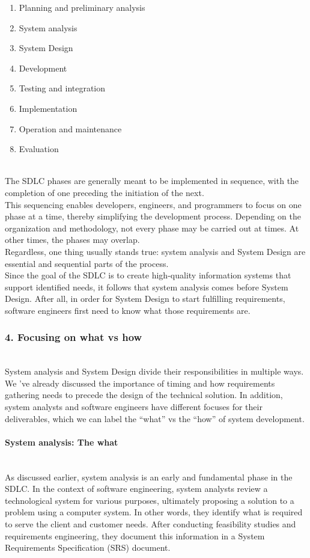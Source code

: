 \begin{enumerate}
\item
Planning and preliminary analysis
\item
System analysis
\item
System Design
\item
Development
\item
Testing and integration
\item
Implementation
\item
Operation and maintenance
\item
Evaluation
\end{enumerate}
\\
The SDLC phases are generally meant to be implemented in sequence, with the completion of one preceding the initiation of the next.
\\
This sequencing enables developers, engineers, and programmers to focus on one phase at a time, thereby simplifying the development process. Depending on the organization and methodology, not every phase may be carried out at times. At other times, the phases may overlap.
\\
Regardless, one thing usually stands true: system analysis and System Design are essential and sequential parts of the process.
\\
Since the goal of the SDLC is to create high-quality information systems that support identified needs, it follows that system analysis comes before System Design. After all, in order for System Design to start fulfilling requirements, software engineers first need to know what those requirements are.

\subsubsection{4. Focusing on what vs how}\label{focusing-on-what-vs-how}
\\
System analysis and System Design divide their responsibilities in multiple ways. We 've already discussed the importance of timing and how requirements gathering needs to precede the design of the technical solution. In addition, system analysts and software engineers have different focuses for their deliverables, which we can label the ``what'' vs the ``how'' of system development.
\\
\paragraph{System analysis: The what}\label{system-analysis-the-what}
\\
As discussed earlier, system analysis is an early and fundamental phase in the SDLC. In the context of software engineering, system analysts review a technological system for various purposes, ultimately proposing a solution to a problem using a computer system. In other words, they identify what is required to serve the client and customer needs. After conducting feasibility studies and requirements engineering, they document this information in a System Requirements Specification (SRS) document.
\\
